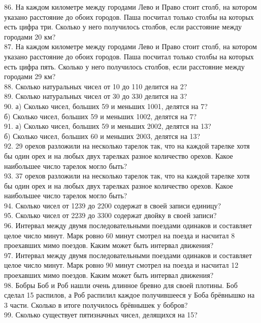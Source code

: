86. На каждом километре между городами Лево и Право стоит столб, на котором указано расстояние до обоих городов. Паша посчитал только столбы на которых есть цифра три. Сколько у него получилось столбов, если расстояние между городами 20 км?\\
87. На каждом километре между городами Лево и Право стоит столб, на котором указано расстояние до обоих городов. Паша посчитал только столбы на которых есть цифра пять. Сколько у него получилось столбов, если расстояние между городами 29 км?\\
88. Сколько натуральных чисел от 10 до 110 делится на 2?\\
89. Сколько натуральных чисел от 30 до 330 делится на 3?\\
90. а) Сколько чисел, больших 59 и меньших 1001, делятся на 7?\\
б) Сколько чисел, больших 59 и меньших 1002, делятся на 7?\\
91. а) Сколько чисел, больших 59 и меньших 2002, делятся на 13?\\
б) Сколько чисел, больших 60 и меньших 2003, делятся на 13?\\
92. 29 орехов разложили на несколько тарелок так, что на каждой тарелке хотя бы один орех и на любых двух тарелках разное количество орехов. Какое наибольшее число тарелок могло быть?\\
93. 37 орехов разложили на несколько тарелок так, что на каждой тарелке хотя бы один орех и на любых двух тарелках разное количество орехов. Какое наибольшее число тарелок могло быть?\\
94. Сколько чисел от 1239 до 2200 содержат в своей записи единицу?\\
95. Сколько чисел от 2239 до 3300 содержат двойку в своей записи?\\
96. Интервал между двумя последовательными поездами одинаков и составляет целое число минут. Марк ровно 60 минут смотрел на поезда и насчитал 8 проехавших мимо поездов. Каким может быть интервал движения?\\
97. Интервал между двумя последовательными поездами одинаков и составляет целое число минут. Марк ровно 90 минут смотрел на поезда и насчитал 12 проехавших мимо поездов. Каким может быть интервал движения?\\
98. Бобры Боб и Роб нашли очень длинное бревно для своей плотины. Боб сделал 15 распилов, а Роб распилил каждое получившееся у Боба брёвнышко на 3 части. Сколько в итоге получилось брёвнышек у бобров?\\
99. Сколько существует пятизначных чисел, делящихся на 15?\\
